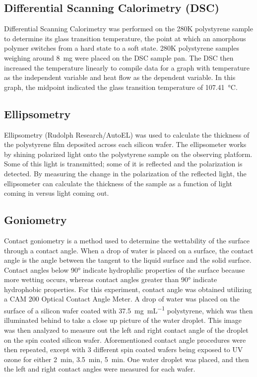 \documentclass[twocolumn]{article}
\begin{document}
            \subsection{Differential Scanning Calorimetry (DSC)}
                Differential Scanning Calorimetry was performed on the 280K polystyrene sample to determine its glass transition temperature, the point at which an amorphous polymer switches from a hard state to a soft state. 280K polystyrene samples weighing around \qty{8}{\milli\gram} were placed on the DSC sample pan. The DSC then increased the temperature linearly to compile data for a graph with temperature as the independent variable and heat flow as the dependent variable. In this graph, the midpoint indicated the glass transition temperature of \qty{107.41}{\degreeCelsius}.

            \subsection{Ellipsometry}
                Ellipsometry (Rudolph Research/AutoEL) was used to calculate the thickness of the polystyrene film deposited across each silicon wafer. The ellipsometer works by shining polarized light onto the polystyrene sample on the observing platform. Some of this light is transmitted; some of it is reflected and the polarization is detected. By measuring the change in the polarization of the reflected light, the ellipsometer can calculate the thickness of the sample as a function of light coming in versus light coming out.

            \subsection{Goniometry}
                Contact goniometry is a method used to determine the wettability of the surface through a contact angle. When a drop of water is placed on a surface, the contact angle is the angle between the tangent to the liquid surface and the solid surface. Contact angles below 90° indicate hydrophilic properties of the surface because more wetting occurs, whereas contact angles greater than 90° indicate hydrophobic properties. For this experiment, contact angle was obtained utilizing a CAM 200 Optical Contact Angle Meter. A drop of water was placed on the surface of a silicon wafer coated with \qty{37.5}{\milli\gram\per\milli\liter} polystyrene, which was then illuminated behind to take a close up picture of the water droplet. This image was then analyzed to measure out the left and right contact angle of the droplet on the spin coated silicon wafer. Aforementioned contact angle procedures were then repeated, except with 3 different spin coated wafers being exposed to UV ozone for either \qty{2}{\minute}, \qty{3.5}{\minute}, \qty{5}{\minute}. One water droplet was placed, and then the left and right contact angles were measured for each wafer. 
            
\end{document}
